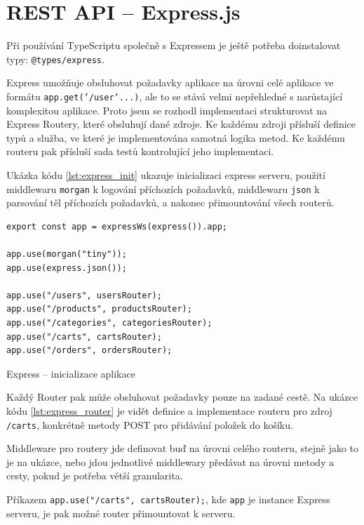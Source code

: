 \documentclass[thesis=M,czech]{FITthesis}[2019/12/23]
\begin{document}
\section{REST API -- Express.js}
Při používání TypeScriptu společně s Expressem je ještě potřeba doinstalovat typy: \texttt{@types/express}.

Express umožňuje obsluhovat požadavky aplikace na úrovni celé aplikace ve formátu \texttt{app.get('/user'...)}, ale to se stává velmi nepřehledné s narůstající komplexitou aplikace. Proto jsem se rozhodl implementaci strukturovat na Express Routery, které obsluhují dané zdroje. Ke každému zdroji přísluší definice typů a služba, ve které je implementována samotná logika metod. Ke každému routeru pak přísluší sada testů kontrolující jeho implementaci.

Ukázka kódu \ref{lst:express_init} ukazuje inicializaci express serveru, použití middlewaru \texttt{morgan} k logování příchozích požadavků, middlewaru \texttt{json} k parsování těl příchozích požadavků, a nakonec přimountování všech routerů.

\begin{listing}[H]
\begin{verbatim}
export const app = expressWs(express()).app;

app.use(morgan("tiny"));
app.use(express.json());

app.use("/users", usersRouter);
app.use("/products", productsRouter);
app.use("/categories", categoriesRouter);
app.use("/carts", cartsRouter);
app.use("/orders", ordersRouter);

\end{verbatim}
\caption{Express -- inicializace aplikace}
\label{lst:express_init}
\end{listing}

Každý Router pak může obsluhovat požadavky pouze na zadané cestě. Na ukázce kódu \ref{lst:express_router} je vidět definice a implementace routeru pro zdroj \texttt{/carts}, konkrétně metody POST pro přidávání položek do košíku.

Middleware pro routery jde definovat buď na úrovni celého routeru, stejně jako to je na ukázce, nebo jdou jednotlivé middlewary předávat na úrovni metody a cesty, pokud je potřeba větší granularita.

Příkazem \texttt{app.use("/carts", cartsRouter);}, kde \texttt{app} je instance Express serveru, je pak možné router přimountovat k serveru.
\end{document}
